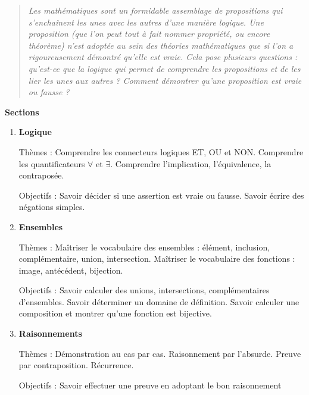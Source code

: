 \documentclass[11pt,a4paper]{report}
\begin{document}



\bigskip
\bigskip

\begin{quote}
\center
\emph{
    Les mathématiques sont un formidable assemblage de propositions qui s'enchaînent les unes avec les autres d'une manière logique. Une proposition (que l'on peut tout à fait nommer \emph{propriété}, ou encore \emph{théorème}) n'est adoptée au sein des théories mathématiques que si l'on a rigoureusement démontré qu'elle est vraie.     
    Cela pose plusieurs questions : qu'est-ce que la \emph{logique} qui permet de comprendre les propositions et de les lier les unes aux autres ? Comment démontrer qu'une proposition est vraie ou fausse ?
    }
\end{quote}

\bigskip
\bigskip


\textbf{Sections}
\begin{enumerate}[label=\arabic*.]
    \item \textbf{Logique}
    
    Thèmes : 
    Comprendre les connecteurs logiques  ET, OU et NON.
    Comprendre les quantificateurs $\forall$ et $\exists$.
    Comprendre l'implication, l'équivalence, la contraposée.
    
    
    Objectifs :
    Savoir décider si une assertion est vraie ou fausse.
    Savoir écrire des négations simples.
    
    
    
     \item  \textbf{Ensembles}
 
     Thèmes :
     Maîtriser le vocabulaire des ensembles : élément, inclusion, complémentaire, union, intersection.
     Maîtriser le vocabulaire des fonctions : image, antécédent, bijection.
 
     Objectifs :    
     Savoir calculer des unions, intersections, complémentaires d'ensembles.
     Savoir déterminer un domaine de définition.
     Savoir calculer une composition et montrer qu'une fonction est bijective.
    
    
    \item  \textbf{Raisonnements}

    Thèmes :         
    Démonstration au cas par cas.
    Raisonnement par l'absurde.
    Preuve par contraposition.
    Récurrence.  
 
    Objectifs :
    Savoir effectuer une preuve en adoptant le bon raisonnement
\end{enumerate}
\end{document}
